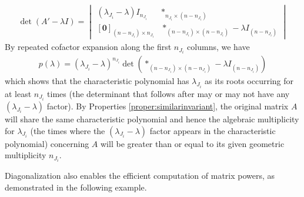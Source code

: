 \begin{align*}
\det(A'-\lambda I) =
\begin{vmatrix}
(\lambda_{J_i}-\lambda) I_{n_{J_i}} & *_{n_{J_i}\times(n-n_{J_i})} \\
[\textbf{0}]_{(n-n_{J_i})\times n_{J_i}} & *_{(n-n_{J_i})\times(n-n_{J_i})}-\lambda I_{(n-n_{J_i})}    
\end{vmatrix}
\end{align*}
By repeated cofactor expansion along the first $n_{J_i}$ columns, we have
\begin{align*}
p(\lambda) = (\lambda_{J_i}-\lambda)^{n_{J_i}} \det(*_{(n-n_{J_i})\times(n-n_{J_i})}-\lambda I_{(n-n_{J_i})})
\end{align*}
which shows that the characteristic polynomial has $\lambda_{J_i}$ as its roots occurring for at least $n_{J_i}$ times (the determinant that follows after may or may not have any $(\lambda_{J_i}-\lambda)$ factor). By Properties \ref{proper:similarinvariant}, the original matrix $A$ will share the same characteristic polynomial and hence the algebraic multiplicity for $\lambda_{J_i}$ (the times where the $(\lambda_{J_i}-\lambda)$ factor appears in the characteristic polynomial) concerning $A$ will be greater than or equal to its given geometric multiplicity $n_{J_i}$.\par

Diagonalization also enables the efficient computation of matrix powers, as demonstrated in the following example.

